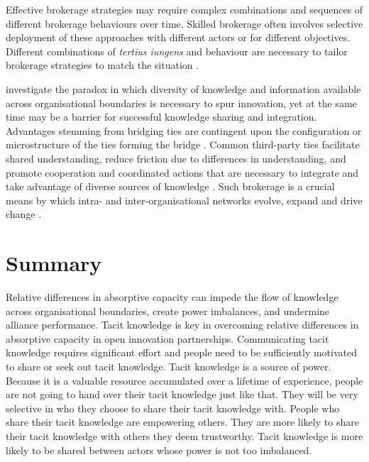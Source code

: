 Effective brokerage strategies may require complex combinations and sequences of different brokerage behaviours over time. Skilled brokerage often involves selective deployment of these approaches with different actors or for different objectives. Different combinations of \emph{tertius iungens} and  behaviour are necessary to tailor brokerage strategies to match the situation \citep{obstfeld2014brokerage}. 

\citet{tortoriello2010activating} investigate the paradox in which diversity of knowledge and information available across organisational boundaries is necessary to spur innovation, yet at the same time may be a barrier for successful knowledge sharing and integration. Advantages stemming from bridging ties are contingent upon the configuration or microstructure of the ties forming the bridge \citep{tortoriello2010activating,tortoriello2015social}. Common third-party ties facilitate shared understanding, reduce friction due to differences in understanding, and promote cooperation and coordinated actions that are necessary to integrate and take advantage of diverse sources of knowledge \citep{tortoriello2010activating}. Such brokerage is a crucial means by which intra- and inter-organisational networks evolve, expand and drive change \citep{obstfeld2014brokerage}.  \medskip


\section{Summary}

Relative differences in absorptive capacity can impede the flow of knowledge across organisational boundaries, create power imbalances, and undermine alliance performance. Tacit knowledge is key in overcoming relative differences in absorptive capacity in open innovation partnerships. Communicating tacit knowledge requires significant effort and people need to be sufficiently motivated to share or seek out tacit knowledge. Tacit knowledge is a source of power. Because it is a valuable resource accumulated over a lifetime of experience, people are not going to hand over their tacit knowledge just like that. They will be very selective in who they choose to share their tacit knowledge with. People who share their tacit knowledge are empowering others. They are more likely to share their tacit knowledge with others they deem trustworthy. Tacit knowledge is more likely to be shared between actors whose power is not too imbalanced.


